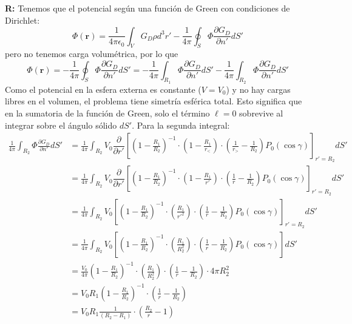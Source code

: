 \documentclass[]{article}
\numberwithin{equation}{section}
\newcommand{\0}{\textcolor{gray}{0}}
\newcommand{\rv}{\mathbf{r}}
\newcommand{\eo}{\epsilon_{0}}
\newcommand{\pd}[2]{\dfrac{\partial #1}{\partial #2}}
\begin{document}
\begin{enumerate}
	\textbf{R:} Tenemos que el potencial según una función de Green con condiciones de Dirichlet:
	\begin{equation*}
		\Phi(\rv) = \frac{1}{4\pi\eo}\int_{V}G_D\rho d^3r' - \frac{1}{4\pi}\oint_{S}\Phi\frac{\partial G_D}{\partial n'} dS'
	\end{equation*}
	pero no tenemos carga volumétrica, por lo que
	\begin{equation*}
		\Phi(\rv) = - \frac{1}{4\pi}\oint_{S} \Phi \frac{\partial G_D}{\partial n'} dS' = - \frac{1}{4\pi}\int_{R_1} \Phi \frac{\partial G_D}{\partial n'} dS' - \frac{1}{4\pi}\int_{R_2} \Phi \frac{\partial G_D}{\partial n'} dS'
	\end{equation*}
	Como el potencial en la esfera externa es constante ($V = V_0$) y no hay cargas libres en el volumen, el problema tiene simetría esférica total. Esto significa que en la sumatoria de la función de Green, solo el término $\ell = 0$ sobrevive al integrar sobre el ángulo sólido $dS'$. Para la segunda integral:
	\begin{align*}
		\frac{1}{4\pi}\int_{R_2} \Phi \frac{\partial G_D}{\partial n'} dS' &= \frac{1}{4\pi}\int_{R_2} V_0 \pd{}{r'} \left[\left(1 - \frac{R_1}{R_2}\right)^{-1} \cdot \left(1 - \frac{R_1}{r_<}\right) \cdot \left(\frac{1}{r_>} - \frac{1}{R_2}\right)  P_{0}(\cos\gamma)\right]_{r'=R_2} dS' \\
		&= \frac{1}{4\pi}\int_{R_2} V_0 \pd{}{r'} \left[\left(1 - \frac{R_1}{R_2}\right)^{-1} \cdot \left(1 - \frac{R_1}{r'}\right) \cdot \left(\frac{1}{r} - \frac{1}{R_2}\right)  P_{0}(\cos\gamma)\right]_{r'=R_2} dS' \\
		&= \frac{1}{4\pi}\int_{R_2} V_0 \left[\left(1 - \frac{R_1}{R_2}\right)^{-1} \cdot \left(\frac{R_1}{r'^2}\right) \cdot \left(\frac{1}{r} - \frac{1}{R_2}\right)  P_{0}(\cos\gamma)\right]_{r'=R_2} dS'\\
		&= \frac{1}{4\pi}\int_{R_2} V_0 \left[\left(1 - \frac{R_1}{R_2}\right)^{-1} \cdot \left(\frac{R_1}{R_2^2}\right) \cdot \left(\frac{1}{r} - \frac{1}{R_2}\right)  P_{0}(\cos\gamma)\right] dS'\\
		&= \frac{V_0}{4\pi} \left(1 - \frac{R_1}{R_2}\right)^{-1} \cdot \left(\frac{R_1}{R_2^2}\right) \cdot \left(\frac{1}{r} - \frac{1}{R_2}\right)\cdot 4\pi R_2^2\\
		&= V_0 R_1 \left(1 - \frac{R_1}{R_2}\right)^{-1} \cdot \left(\frac{1}{r} - \frac{1}{R_2}\right)\\
		&= V_0 R_1 \frac{1}{\left(R_2 - R_1\right)} \cdot \left(\frac{R_2}{r} - 1\right)
	\end{align*}

\end{enumerate}
\end{document}
